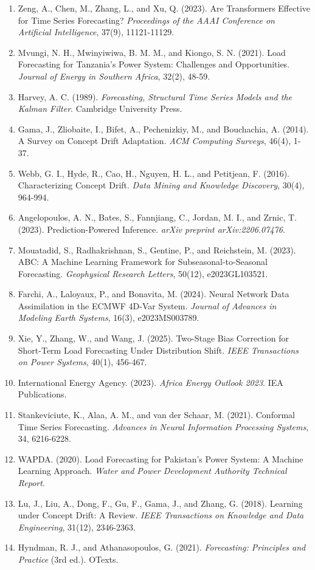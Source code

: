 \begin{enumerate}
\def\labelenumi{\arabic{enumi}.}
\item
  Zeng, A., Chen, M., Zhang, L., and Xu, Q. (2023). Are Transformers
  Effective for Time Series Forecasting? \emph{Proceedings of the AAAI
  Conference on Artificial Intelligence}, 37(9), 11121-11129.
\item
  Mvungi, N. H., Mwinyiwiwa, B. M. M., and Kiongo, S. N. (2021). Load
  Forecasting for Tanzania's Power System: Challenges and Opportunities.
  \emph{Journal of Energy in Southern Africa}, 32(2), 48-59.
\item
  Harvey, A. C. (1989). \emph{Forecasting, Structural Time Series Models
  and the Kalman Filter}. Cambridge University Press.
\item
  Gama, J., Zliobaite, I., Bifet, A., Pechenizkiy, M., and Bouchachia,
  A. (2014). A Survey on Concept Drift Adaptation. \emph{ACM Computing
  Surveys}, 46(4), 1-37.
\item
  Webb, G. I., Hyde, R., Cao, H., Nguyen, H. L., and Petitjean, F.
  (2016). Characterizing Concept Drift. \emph{Data Mining and Knowledge
  Discovery}, 30(4), 964-994.
\item
  Angelopoulos, A. N., Bates, S., Fannjiang, C., Jordan, M. I., and
  Zrnic, T. (2023). Prediction-Powered Inference. \emph{arXiv preprint
  arXiv:2206.07476}.
\item
  Mouatadid, S., Radhakrishnan, S., Gentine, P., and Reichstein, M.
  (2023). ABC: A Machine Learning Framework for Subseasonal-to-Seasonal
  Forecasting. \emph{Geophysical Research Letters}, 50(12),
  e2023GL103521.
\item
  Farchi, A., Laloyaux, P., and Bonavita, M. (2024). Neural Network Data
  Assimilation in the ECMWF 4D-Var System. \emph{Journal of Advances in
  Modeling Earth Systems}, 16(3), e2023MS003789.
\item
  Xie, Y., Zhang, W., and Wang, J. (2025). Two-Stage Bias Correction for
  Short-Term Load Forecasting Under Distribution Shift. \emph{IEEE
  Transactions on Power Systems}, 40(1), 456-467.
\item
  International Energy Agency. (2023). \emph{Africa Energy Outlook
  2023}. IEA Publications.
\item
  Stankeviciute, K., Alaa, A. M., and van der Schaar, M. (2021).
  Conformal Time Series Forecasting. \emph{Advances in Neural
  Information Processing Systems}, 34, 6216-6228.
\item
  WAPDA. (2020). Load Forecasting for Pakistan's Power System: A Machine
  Learning Approach. \emph{Water and Power Development Authority
  Technical Report}.
\item
  Lu, J., Liu, A., Dong, F., Gu, F., Gama, J., and Zhang, G. (2018).
  Learning under Concept Drift: A Review. \emph{IEEE Transactions on
  Knowledge and Data Engineering}, 31(12), 2346-2363.
\item
  Hyndman, R. J., and Athanasopoulos, G. (2021). \emph{Forecasting:
  Principles and Practice} (3rd ed.). OTexts.
\end{enumerate}

